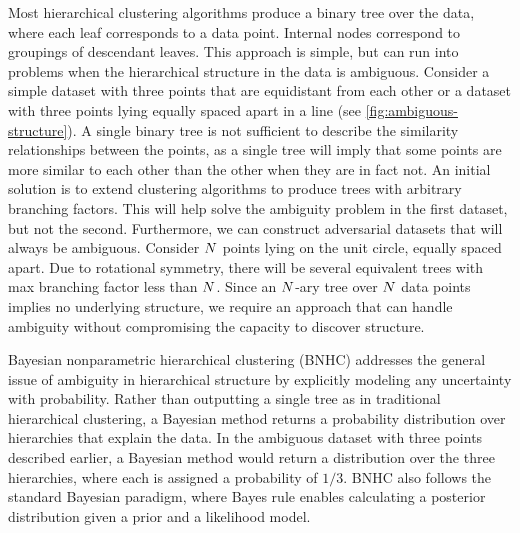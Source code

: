 Most hierarchical clustering algorithms
produce a binary tree over the data,
where each leaf corresponds to a data point.
Internal nodes correspond to groupings of descendant leaves.
This approach is simple, but can run into
problems when the hierarchical structure
in the data is ambiguous. Consider
a simple dataset with three points
that are equidistant from each other 
or a dataset with three points
lying equally spaced apart in a line (see \autoref{fig:ambiguous-structure}).
A single binary tree is not sufficient
to describe the similarity relationships
between the points, as a single tree
will imply that some points are more similar
to each other than the other
when they are in fact not.
An initial solution is to extend clustering
algorithms to produce trees with arbitrary
branching factors.
This will help solve the
ambiguity problem
in the first dataset, but
not the second.
Furthermore, we can construct 
adversarial datasets
that will always be ambiguous.
Consider $N$ points lying on the unit circle, equally spaced apart.
Due to rotational symmetry, there will be several
equivalent trees with max branching factor less than $N$.
Since an $N$-ary tree over $N$ data points
implies no underlying structure,
we require an approach that can
handle ambiguity without compromising
the capacity to discover structure.

Bayesian nonparametric hierarchical clustering (BNHC)
addresses the general issue of
ambiguity in hierarchical structure
by explicitly modeling any uncertainty with probability.
Rather than outputting a single tree
as in traditional hierarchical clustering,
a Bayesian method
returns a probability distribution
over hierarchies that explain the data.
In the ambiguous dataset with three points described earlier,
a Bayesian method would return
a distribution over the three hierarchies,
where each is assigned
a probability of $1/3$.
BNHC
also follows the standard Bayesian paradigm,
where Bayes rule enables
calculating a posterior distribution
given a prior and a likelihood model.


